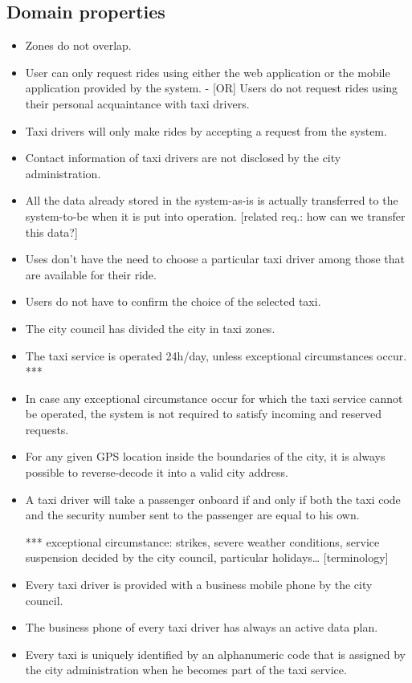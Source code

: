 \subsection{Domain properties}
\begin{itemize}
\item Zones do not overlap.
\item User can only request rides using either the web application or the mobile application provided by the system.
- [OR] Users do not request rides using their personal acquaintance with taxi drivers.
\item Taxi drivers will only make rides by accepting a request from the system.
\item Contact information of taxi drivers are not disclosed by the city administration.
\item All the data already stored in the system-as-is is actually transferred to the system-to-be when it is put into operation. [related req.: how can we transfer this data?]
\item Uses don't have the need to choose a particular taxi driver among those that are available for their ride.
\item Users do not have to confirm the choice of the selected taxi.
\item The city council has divided the city in taxi zones.
\item The taxi service is operated 24h/day, unless exceptional circumstances occur. ***
\item In case any exceptional circumstance occur for which the taxi service cannot be operated, the system is not required to satisfy incoming and reserved requests. 
\item For any given GPS location inside the boundaries of the city, it is always possible to reverse-decode it into a valid city address. 
\item A taxi driver will take a passenger onboard if and only if both the taxi code and the security number sent to the passenger are equal to his own. 

*** exceptional circumstance: strikes, severe weather conditions, service suspension decided by the city council, particular holidays… [terminology]
\item Every taxi driver is provided with a business mobile phone by the city council.
\item The business phone of every taxi driver has always an active data plan.
\item Every taxi is uniquely identified by an alphanumeric code that is assigned by the city administration when he becomes part of the taxi service.
\end{itemize}

